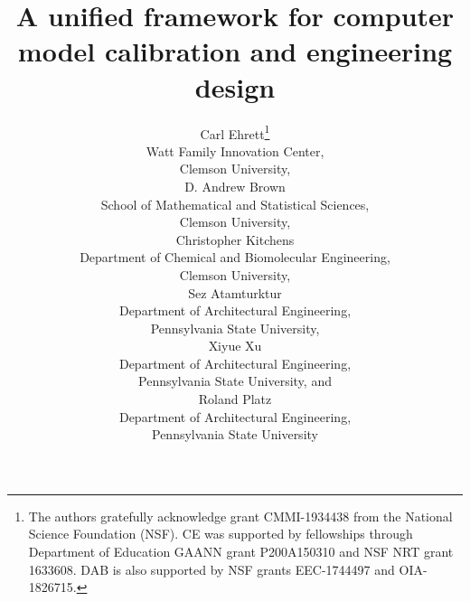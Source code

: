 \documentclass[12pt]{article}
\date{}
\begin{document}
	
%

\def\spacingset#1{\renewcommand{\baselinestretch}%
	{#1}\small\normalsize} \spacingset{1}



\title{\bf A unified framework for computer model calibration and engineering design}
\author{Carl Ehrett\thanks{
		The authors gratefully acknowledge grant CMMI-1934438 from the National Science Foundation (NSF). CE was supported by fellowships through Department of Education GAANN grant P200A150310 and NSF NRT grant 1633608. DAB is also supported by NSF grants EEC-1744497 and OIA-1826715.}\hspace{.2cm}\\
	Watt Family Innovation Center, \\Clemson University,\vspace{5pt} \\
	D. Andrew Brown \\
	School of Mathematical and Statistical Sciences, \\Clemson University,\vspace{5pt} \\
	Christopher Kitchens \\
	Department of Chemical and Biomolecular Engineering, \\Clemson University,\vspace{5pt} \\
	Sez Atamturktur \\
	Department of Architectural Engineering, \\Pennsylvania State University,\vspace{5pt} \\
	Xiyue Xu \\
	Department of Architectural Engineering, \\Pennsylvania State University,
	and \vspace{5pt} \\
	Roland Platz \\
	Department of Architectural Engineering, \\Pennsylvania State University}
\maketitle

\spacingset{2} %

\else %
\end{document}
